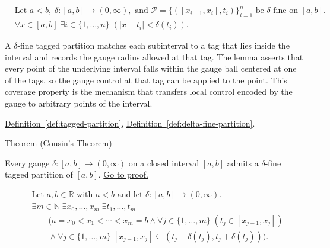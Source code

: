 \begin{remark*}
\[
\begin{aligned}
&\text{Let } a<b,\; \delta:[a,b]\to(0,\infty), \text{ and } \dot{\mathcal{P}}=\{([x_{i-1},x_i],t_i)\}_{i=1}^n \text{ be }\delta\text{-fine on }[a,b].\\
&\forall x\in[a,b]\;\exists i\in\{1,\ldots,n\}\;(|x-t_i|<\delta(t_i)).
\end{aligned}
\]
\end{remark*}

\begin{remark*}[Interpretation]
A $\delta$-fine tagged partition matches each subinterval to a tag that lies inside the interval and records the gauge radius allowed at that tag. The lemma asserts that every point of the underlying interval falls within the gauge ball centered at one of the tags, so the gauge control at that tag can be applied to the point. This coverage property is the mechanism that transfers local control encoded by the gauge to arbitrary points of the interval.
\end{remark*}

\begin{dependencies}
\hyperref[def:tagged-partition]{Definition~\ref*{def:tagged-partition}},
\hyperref[def:delta-fine-partition]{Definition~\ref*{def:delta-fine-partition}}.
\end{dependencies}


\begin{theorembox}{Theorem (Cousin's Theorem)}
\begin{theorem}
\label{thm:cousins-theorem}
Every gauge $\delta:[a,b]\to(0,\infty)$ on a closed interval $[a,b]$
admits a $\delta$-fine tagged partition of $[a,b]$.
\hyperref[prf:cousins-theorem]{Go to proof.}
\end{theorem}
\end{theorembox}

\begin{remark*}
\[
\begin{aligned}
&\text{Let } a,b \in \mathbb{R} \text{ with } a < b \text{ and let } \delta:[a,b]\to(0,\infty).\\
&\exists m \in \mathbb{N}\;\exists x_0,\ldots,x_m\;\exists t_1,\ldots,t_m\\
&\qquad\bigl(a=x_0<x_1<\cdots<x_m=b
\land \forall j\in\{1,\ldots,m\}\;(t_j\in[x_{j-1},x_j])\\
&\qquad\land
\forall j\in\{1,\ldots,m\}\;[x_{j-1},x_j]\subseteq
(t_j-\delta(t_j),t_j+\delta(t_j))\bigr).
\end{aligned}
\]
\end{remark*}

